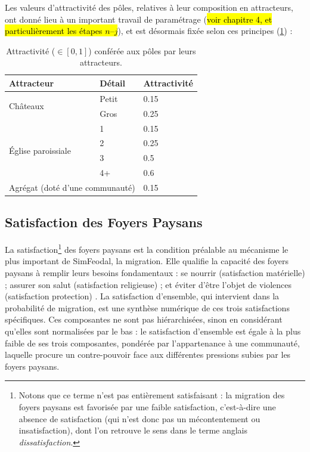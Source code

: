 Les valeurs d'attractivité des pôles, relatives à leur composition en attracteurs, ont donné lieu à un important travail de paramétrage (\hl{voir chapitre 4, et particulièrement les étapes $n$--$j$}), et est désormais fixée selon ces principes (\cref{tab:attraction-poles}) :

\begin{table}[H]
	\centering
		\caption{Attractivité ($\in [0,1]$) conférée aux pôles par leurs attracteurs.}
	\label{tab:attraction-poles}
	{\renewcommand{\arraystretch}{1.1}%
	\begin{tabular}{|l|l|l|}\hline
		\textbf{Attracteur} & \textbf{Détail} & \textbf{Attractivité} \\ \hline
		\multirow{2}{*}{Châteaux} & Petit & 0.15 \\
		& Gros & 0.25 \\ \hline
		\multirow{4}{*}{Église paroissiale} & 1 & 0.15 \\
		& 2 & 0.25 \\
		& 3 & 0.5 \\
		& 4+ & 0.6 \\ \hline
		\multicolumn{2}{|l|}{Agrégat (doté d'une communauté)} & 0.15 \\ \hline
	\end{tabular}}

\end{table}

\subsection{Satisfaction des Foyers Paysans}

La satisfaction\footnote{
Notons que ce terme n'est pas entièrement \og satisfaisant\fg{} : la migration des foyers paysans est favorisée par une faible satisfaction, c'est-à-dire une absence de satisfaction (qui n'est donc pas un mécontentement ou \og insatisfaction\fg{}), dont l'on retrouve le sens dans le terme anglais \textit{dissatisfaction}.
} des foyers paysans est la condition préalable au mécanisme le plus important de SimFeodal, la migration.
Elle qualifie la capacité des foyers paysans à remplir leurs besoins fondamentaux : \og se nourrir\fg{} (satisfaction matérielle) ; \og assurer son salut\fg{} (satisfaction religieuse) ; et \og éviter d'être l'objet de violences\fg{} (satisfaction \og protection\fg{}) \autocite[Tableau 1, \ppno~309]{cura_transition_2017}.
La satisfaction d'ensemble, qui intervient dans la probabilité de migration, est une synthèse numérique de ces trois satisfactions spécifiques.
Ces composantes ne sont pas hiérarchisées, sinon en considérant qu'elles sont normalisées \og par le bas\fg{} : le satisfaction d'ensemble est égale à la plus faible de ses trois composantes, pondérée par l'appartenance à une communauté, laquelle procure un contre-pouvoir face aux différentes pressions subies par les foyers paysans.

